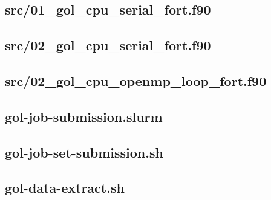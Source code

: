 \documentclass[]{article}
\begin{document}


\newpage
\subsection{src/01\_gol\_cpu\_serial\_fort.f90}
\label{sec:01_gol_cpu_serial_fort}



\newpage
\subsection{src/02\_gol\_cpu\_serial\_fort.f90}
\label{sec:02_gol_cpu_serial_fort}



\newpage
\subsection{src/02\_gol\_cpu\_openmp\_loop\_fort.f90}
\label{sec:02_gol_cpu_openmp_loop_fort}



\newpage
\subsection{gol-job-submission.slurm}
\label{sec:gol-job-submission}



\newpage
\subsection{gol-job-set-submission.sh}
\label{sec:gol-job-set-submission}



\newpage
\subsection{gol-data-extract.sh}
\label{sec:gol-data-extract}


\end{document}
